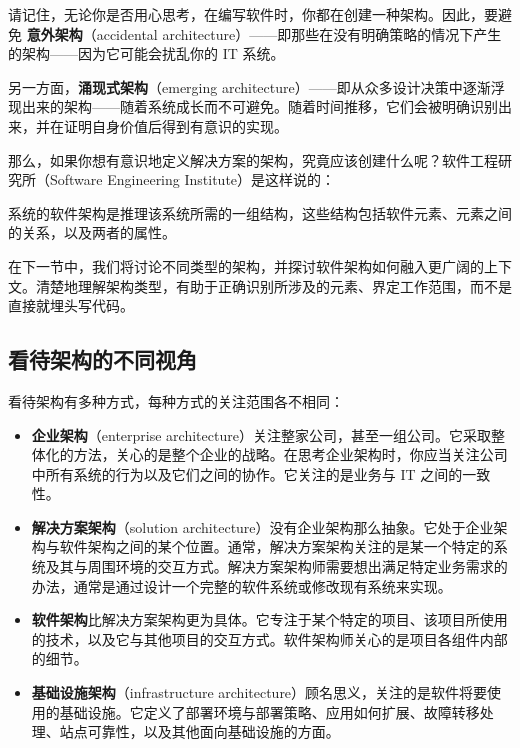 \label{idx:001}
请记住，无论你是否用心思考，在编写软件时，你都在创建一种架构。因此，要避免 \textbf{意外架构}（accidental architecture）——即那些在没有明确策略的情况下产生的架构——因为它可能会扰乱你的 IT 系统。

\label{idx:002}
另一方面，\textbf{涌现式架构}（emerging architecture）——即从众多设计决策中逐渐浮现出来的架构——随着系统成长而不可避免。随着时间推移，它们会被明确识别出来，并在证明自身价值后得到有意识的实现。

那么，如果你想有意识地定义解决方案的架构，究竟应该创建什么呢？软件工程研究所（Software Engineering Institute）是这样说的：

\begin{myQuote}
系统的软件架构是推理该系统所需的一组结构，这些结构包括软件元素、元素之间的关系，以及两者的属性。

\end{myQuote}

\label{idx:003}
在下一节中，我们将讨论不同类型的架构，并探讨软件架构如何融入更广阔的上下文。清楚地理解架构类型，有助于正确识别所涉及的元素、界定工作范围，而不是直接就埋头写代码。

\subsection{看待架构的不同视角}

看待架构有多种方式，每种方式的关注范围各不相同：

\begin{itemize}
\label{idx:004}
\item \textbf{企业架构}（enterprise architecture）关注整家公司，甚至一组公司。它采取整体化的方法，关心的是整个企业的战略。在思考企业架构时，你应当关注公司中所有系统的行为以及它们之间的协作。它关注的是业务与 IT 之间的一致性。
\item \textbf{解决方案架构}（solution architecture）没有企业架构那么抽象。它处于企业架构与软件架构之间的某个位置。通常，解决方案架构关注的是某一个特定的系统及其与周围环境的交互方式。解决方案架构师需要想出满足特定业务需求的办法，通常是通过设计一个完整的软件系统或修改现有系统来实现。
\item \textbf{软件架构}比解决方案架构更为具体。它专注于某个特定的项目、该项目所使用的技术，以及它与其他项目的交互方式。软件架构师关心的是项目各组件内部的细节。
\item \textbf{基础设施架构}（infrastructure architecture）顾名思义，关注的是软件将要使用的基础设施。它定义了部署环境与部署策略、应用如何扩展、故障转移处理、站点可靠性，以及其他面向基础设施的方面。
\end{itemize}

